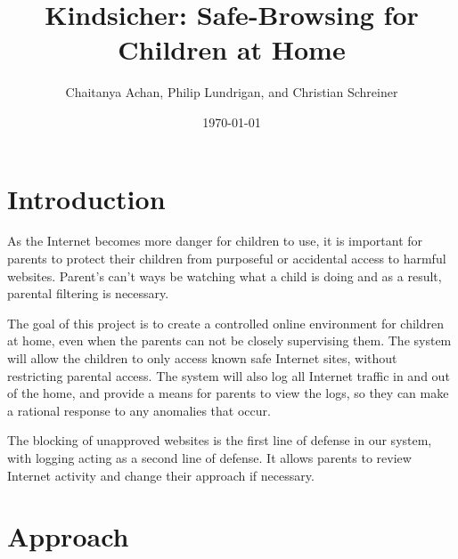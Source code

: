 \documentclass[12pt] {article}
\begin{document}
\title{Kindsicher: Safe-Browsing for Children at Home}
\author{Chaitanya Achan, Philip Lundrigan, and Christian Schreiner}
\date \today
\maketitle
\setcounter{page}{1}

%
%
%
%
%
%
%

\section*{Introduction}
As the Internet becomes more danger for children to use, it is important for
parents to protect their children from purposeful or accidental access to
harmful websites. Parent's can't ways be watching what a child is doing and as
a result, parental filtering is necessary.

The goal of this project is to create a controlled online environment for
children at home, even when the parents can not be closely supervising them.
The system will allow the children to only access known safe Internet sites,
without restricting parental access. The system will also log all Internet
traffic in and out of the home, and provide a means for parents to view the
logs, so they can make a rational response to any anomalies that occur.

The blocking of unapproved websites is the first line of defense in our system,
with logging acting as a second line of defense. It allows parents to review
Internet activity and change their approach if necessary.


\section*{Approach}
\end{document}
